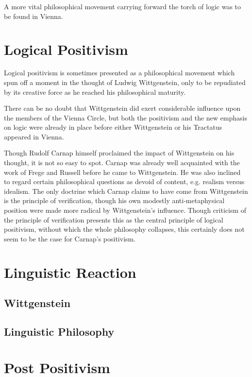 A more vital philosophical movement carrying forward the torch of logic was to be found in Vienna.


\section{Logical Positivism}


Logical positivism is sometimes presented as a philosophical movement which spun off a moment in the thought of Ludwig Wittgenstein, only to be repudiated by its creative force as he reached his philosophical maturity.

There can be no doubt that Wittgenstein did exert considerable influence upon the members of the Vienna Circle, but both the positivism and the new emphasis on logic were already in place before either Wittgenstein or his Tractatus appeared in Vienna.

Though Rudolf Carnap himself proclaimed the impact of Wittgenstein on his thought, it is not so easy to spot.
Carnap was already well acquainted with the work of Frege and Russell before he came to Wittgenstein.
He was also inclined to regard certain philosophical questions as devoid of content, e.g. realism versus idealism. 
The only doctrine which Carnap claims to have come from Wittgenstein is the principle of verification, though his own modestly anti-metaphysical position were made more radical by Wittgenstein's influence.
Though criticism of the principle of verification presents this as the central principle of logical positivism, without which the whole philosophy collapses, this certainly does not seem to be the case for Carnap's positivism.


\section{Linguistic Reaction}

\subsection{Wittgenstein}


\subsection{Linguistic Philosophy}

\section{Post Positivism}


